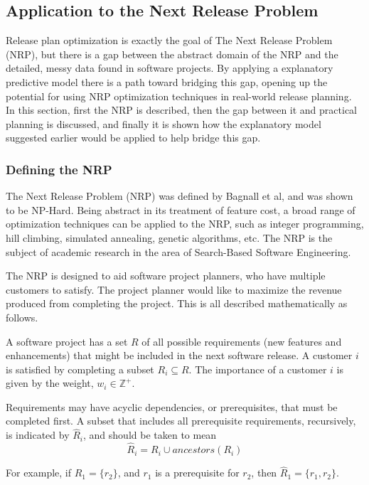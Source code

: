 \documentclass[a4paper]{scrartcl}
\begin{document}
\subsection*{Application to the Next Release Problem}
Release plan optimization is exactly the goal of The Next Release Problem (NRP), but there is a gap between the abstract domain of the NRP and the detailed, messy data found in software projects. By applying a explanatory predictive model there is a path toward bridging this gap, opening up the potential for using NRP optimization techniques in real-world release planning. In this section, first the NRP is described, then the gap between it and practical planning is discussed, and finally it is shown how the explanatory model suggested earlier would be applied to help bridge this gap.

\subsubsection*{Defining the NRP}
The Next Release Problem (NRP) was defined by Bagnall et al\cite{2001_bagnall_nrp}, and was shown to be NP-Hard. Being abstract in its treatment of feature cost, a broad range of optimization techniques can be applied to the NRP, such as integer programming, hill climbing, simulated annealing, genetic algorithms, etc. The NRP is the subject of academic research in the area of Search-Based Software Engineering\cite{2010_jiang_hybrid,2012_xuan_solving,2007_zhang_multi_obj_nrp}.

The NRP is designed to aid software project planners, who have multiple customers to satisfy. The project planner would like to maximize the revenue produced from completing the project. This is all described mathematically as follows.

A software project has a set $R$ of all possible requirements (new features and enhancements) that might be included in the next software release. A customer $i$ is satisfied by completing a subset $R_i \subseteq R$. The importance of a customer $i$ is given by the weight, $w_i \in \mathbb{Z}^+$.

Requirements may have acyclic dependencies, or prerequisites, that must be completed first. A subset that includes all prerequisite requirements, recursively, is indicated by $\hat{R}_i$, and should be taken to mean
\begin{equation}
\hat{R}_i = R_i \cup ancestors(R_i)
\end{equation}

For example, if $R_1 = \{r_2\}$, and $r_1$ is a prerequisite for $r_2$, then $\hat{R}_1 = \{r_1,r_2\}$.
\end{document}
